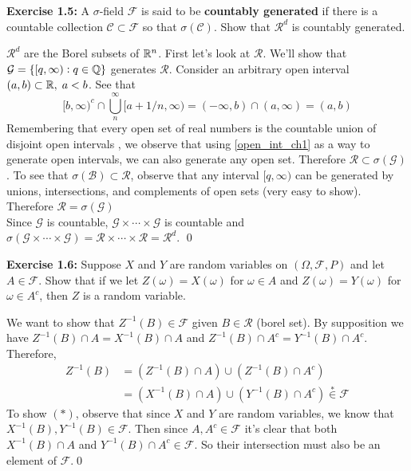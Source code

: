 \vspace{0.3cm}
\noindent\textbf{Exercise 1.5:} A $\sigma$-field $\mathcal{F}$ is said to be \textbf{countably generated} if there is a countable collection $\mathcal{C} \subset \mathcal{F}$ so that $\sigma(\mathcal{C})$. Show that $\mathcal{R}^d$ is countably generated.
\begin{mdframed}
    $\mathcal{R}^d$ are the Borel subsets of $\mathbb{R}^n$. First let's look at $\mathcal{R}$. We'll show that $\mathcal{G} = \{[q, \infty): q \in \mathbb{Q}\}$ generates  $\mathcal{R}$. Consider an arbitrary open interval $(a, b)\subset \mathbb{R}, \; a < b$. See that 
    \begin{equation}\label{open_int_ch1}
        [b, \infty)^c \cap \bigcup_{n}^\infty[a + 1/n, \infty) = (-\infty, b) \cap (a, \infty) = (a,b) 
    \end{equation}
    Remembering that every open set of real numbers is the countable union of disjoint open intervals \cite[42]{royden2nd}, we observe that using \ref{open_int_ch1} as a way to generate open intervals, we can also generate any open set. Therefore $\mathcal{R} \subset \sigma(\mathcal{G})$. To see that $\sigma (\mathcal{B}) \subset \mathcal{R}$, observe that any interval $[q, \infty)$ can be generated by unions, intersections, and complements of open sets (very easy to show). Therefore $\mathcal{R} = \sigma(\mathcal{G})$\\
    Since $\mathcal{G}$ is countable, $\mathcal{G} \times \cdots \times \mathcal{G}$ is countable and $\sigma(\mathcal{G} \times \cdots \times \mathcal{G}) = \mathcal{R} \times \cdots \times \mathcal{R} = \mathcal{R}^d$. \qed

\end{mdframed}
\textbf{Exercise 1.6:} Suppose $X$ and $Y$ are random variables on $(\Omega, \mathcal{F}, P)$ and let $A \in \mathcal{F}$. Show that if we let $Z(\omega) = X(\omega)$ for $\omega \in A$ and $Z(\omega) = Y\left( \omega \right)$ for $\omega \in A^c$, then $Z$ is a random variable.
\begin{mdframed}
    We want to show that $Z^{-1}(B) \in \mathcal{F}$ given $B \in \mathcal{R}$ (borel set). By supposition we have $Z^{-1}(B)\cap A = X^{-1}(B)\cap A$ and $Z^{-1}(B)\cap A^c = Y^{-1}(B)\cap A^c$. Therefore, 
    \begin{align*}
        Z^{-1}(B) &= (Z^{-1}(B) \cap A) \cup (Z^{-1}(B) \cap A^c) \\
        &= (X^{-1}(B) \cap A) \cup (Y^{-1}(B) \cap A^c) \overset{*}{\in} \mathcal{F}
    \end{align*}
    To show $(\ast)$, observe that since $X$ and $Y$ are random variables, we know that $X^{-1}(B), Y^{-1}(B)\in \mathcal{F}$. Then since $A, A^c \in \mathcal{F}$ it's clear that both $X^{-1}(B) \cap A$ and $Y^{-1}(B) \cap A^c \in \mathcal{F}$. So their intersection must also be an element of $\mathcal{F}$.\qed
\end{mdframed}
